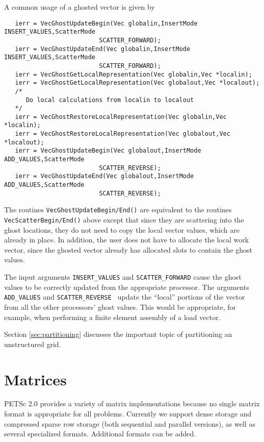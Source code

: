 A common usage of a ghosted vector is given by
 
\begin{verbatim}
   ierr = VecGhostUpdateBegin(Vec globalin,InsertMode INSERT_VALUES,ScatterMode
                          SCATTER_FORWARD);
   ierr = VecGhostUpdateEnd(Vec globalin,InsertMode INSERT_VALUES,ScatterMode
                          SCATTER_FORWARD);
   ierr = VecGhostGetLocalRepresentation(Vec globalin,Vec *localin);
   ierr = VecGhostGetLocalRepresentation(Vec globalout,Vec *localout);
   /*
      Do local calculations from localin to localout 
   */
   ierr = VecGhostRestoreLocalRepresentation(Vec globalin,Vec *localin);
   ierr = VecGhostRestoreLocalRepresentation(Vec globalout,Vec *localout);
   ierr = VecGhostUpdateBegin(Vec globalout,InsertMode ADD_VALUES,ScatterMode
                          SCATTER_REVERSE);
   ierr = VecGhostUpdateEnd(Vec globalout,InsertMode ADD_VALUES,ScatterMode
                          SCATTER_REVERSE);
\end{verbatim}
      
The routines {\tt VecGhostUpdateBegin/End()} are equivalent to the routines {\tt VecScatterBegin/End()}
above except that since they are scattering into the ghost locations, they do not need
to copy the local vector values, which are already in place. In addition, the user does not
have to allocate the local work vector, since the ghosted vector already has allocated 
slots to contain the ghost values.

The input arguments {\tt INSERT\_VALUES} and {\tt SCATTER\_FORWARD}
cause the ghost values to be correctly updated from the appropriate
processor. The arguments {\tt ADD\_VALUES} and {\tt SCATTER\_REVERSE }
update the ``local'' portions of the vector from all the other
processors' ghost values.  This would be appropriate, for example,
when performing a finite element assembly of a load vector.

Section \ref{sec:partitioning} discusses the important topic of partitioning 
an unstructured grid.


\chapter{Matrices}
\label{chapter:matrices}

PETSc 2.0 provides a variety of matrix implementations because no
single matrix format is appropriate for all problems.  Currently we
support dense storage and compressed sparse row storage (both
sequential and parallel versions), as well as several specialized
formats.  Additional formats can be added.


